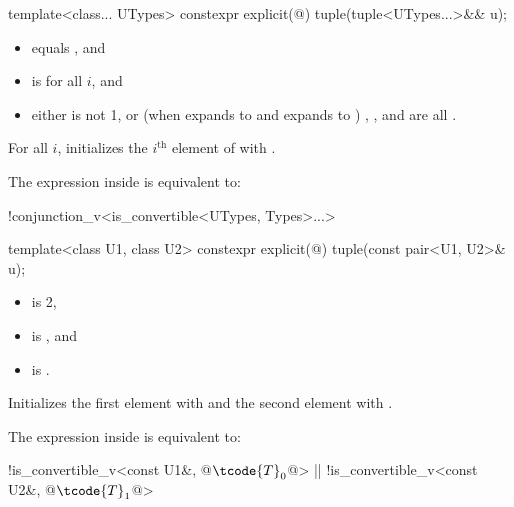 %
\begin{itemdecl}
template<class... UTypes> constexpr explicit(@\seebelow@) tuple(tuple<UTypes...>&& u);
\end{itemdecl}

\begin{itemdescr}
\pnum
\constraints
\begin{itemize}
\item
{} equals , and

\item
{} is  for all $i$, and

\item
either
 is not 1, or
(when  expands to  and  expands to )
, ,
and  are all .
\end{itemize}

\pnum
\effects
For all $i$,
initializes the $i^\text{th}$ element of  with
.

\pnum
\remarks
The expression inside  is equivalent to:
\begin{codeblock}
!conjunction_v<is_convertible<UTypes, Types>...>
\end{codeblock}
\end{itemdescr}

%
%
\begin{itemdecl}
template<class U1, class U2> constexpr explicit(@\seebelow@) tuple(const pair<U1, U2>& u);
\end{itemdecl}

\begin{itemdescr}
\pnum
\constraints
\begin{itemize}
\item {} is 2,
\item {} is , and
\item {} is .
\end{itemize}

\pnum
\effects
Initializes the first element with  and the
second element with .

\pnum
The expression inside  is equivalent to:
\begin{codeblock}
!is_convertible_v<const U1&, @$\tcode{T}_0$@> || !is_convertible_v<const U2&, @$\tcode{T}_1$@>
\end{codeblock}
\end{itemdescr}

